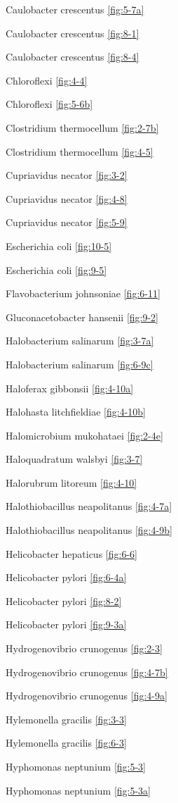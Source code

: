 \documentclass[]{tufte-book}
\begin{document}
Caulobacter crescentus \ref{fig:5-7a}

Caulobacter crescentus \ref{fig:8-1}

Caulobacter crescentus \ref{fig:8-4}

Chloroflexi \ref{fig:4-4}

Chloroflexi \ref{fig:5-6b}

Clostridium thermocellum \ref{fig:2-7b}

Clostridium thermocellum \ref{fig:4-5}

Cupriavidus necator \ref{fig:3-2}

Cupriavidus necator \ref{fig:4-8}

Cupriavidus necator \ref{fig:5-9}

Escherichia coli \ref{fig:10-5}

Escherichia coli \ref{fig:9-5}

Flavobacterium johnsoniae \ref{fig:6-11}

Gluconacetobacter hansenii \ref{fig:9-2}

Halobacterium salinarum \ref{fig:3-7a}

Halobacterium salinarum \ref{fig:6-9c}

Haloferax gibbonsii \ref{fig:4-10a}

Halohasta litchfieldiae \ref{fig:4-10b}

Halomicrobium mukohataei \ref{fig:2-4e}

Haloquadratum walsbyi \ref{fig:3-7}

Halorubrum litoreum \ref{fig:4-10}

Halothiobacillus neapolitanus \ref{fig:4-7a}

Halothiobacillus neapolitanus \ref{fig:4-9b}

Helicobacter hepaticus \ref{fig:6-6}

Helicobacter pylori \ref{fig:6-4a}

Helicobacter pylori \ref{fig:8-2}

Helicobacter pylori \ref{fig:9-3a}

Hydrogenovibrio crunogenus \ref{fig:2-3}

Hydrogenovibrio crunogenus \ref{fig:4-7b}

Hydrogenovibrio crunogenus \ref{fig:4-9a}

Hylemonella gracilis \ref{fig:3-3}

Hylemonella gracilis \ref{fig:6-3}

Hyphomonas neptunium \ref{fig:5-3}

Hyphomonas neptunium \ref{fig:5-3a}
\end{document}
